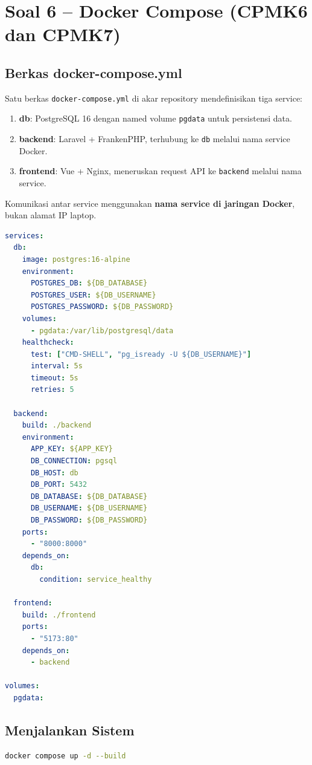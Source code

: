 \documentclass[12pt,letterpaper]{report}
\begin{document}
\section{Soal 6 -- Docker Compose (CPMK6 dan CPMK7)}

\subsection{Berkas docker-compose.yml}
Satu berkas \texttt{docker-compose.yml} di akar repository mendefinisikan tiga service:

\begin{enumerate}[label=\alph*.]
    \item \textbf{db}: PostgreSQL 16 dengan named volume \texttt{pgdata} untuk persistensi data.
    \item \textbf{backend}: Laravel + FrankenPHP, terhubung ke \texttt{db} melalui nama service Docker.
    \item \textbf{frontend}: Vue + Nginx, meneruskan request API ke \texttt{backend} melalui nama service.
\end{enumerate}

Komunikasi antar service menggunakan \textbf{nama service di jaringan Docker}, bukan alamat IP laptop.

\begin{lstlisting}[language=yaml,caption={docker-compose.yml}]
services:
  db:
    image: postgres:16-alpine
    environment:
      POSTGRES_DB: ${DB_DATABASE}
      POSTGRES_USER: ${DB_USERNAME}
      POSTGRES_PASSWORD: ${DB_PASSWORD}
    volumes:
      - pgdata:/var/lib/postgresql/data
    healthcheck:
      test: ["CMD-SHELL", "pg_isready -U ${DB_USERNAME}"]
      interval: 5s
      timeout: 5s
      retries: 5

  backend:
    build: ./backend
    environment:
      APP_KEY: ${APP_KEY}
      DB_CONNECTION: pgsql
      DB_HOST: db
      DB_PORT: 5432
      DB_DATABASE: ${DB_DATABASE}
      DB_USERNAME: ${DB_USERNAME}
      DB_PASSWORD: ${DB_PASSWORD}
    ports:
      - "8000:8000"
    depends_on:
      db:
        condition: service_healthy

  frontend:
    build: ./frontend
    ports:
      - "5173:80"
    depends_on:
      - backend

volumes:
  pgdata:
\end{lstlisting}

\subsection{Menjalankan Sistem}
\begin{lstlisting}[language=bash]
docker compose up -d --build
\end{lstlisting}
\end{document}
